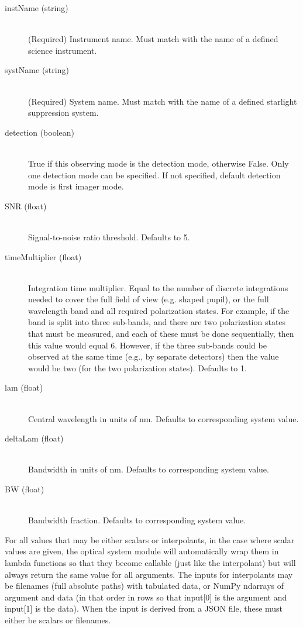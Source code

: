 \documentclass[cleanfoot]{asme2ej}
\begin{document}
\begin{itemize}
\begin{description}
    \begin{description}
        \item[instName (string)]\hfill \\ (Required) Instrument name. Must match with the name of a defined science instrument.
        \item[systName (string)]\hfill \\ (Required) System name. Must match with the name of a defined starlight suppression system.
        \item[detection (boolean)]\hfill \\ True if this observing mode is the detection mode, otherwise False. Only one detection mode can be specified. If not specified, default detection mode is first imager mode.
        \item[SNR (float)]\hfill \\ Signal-to-noise ratio threshold. Defaults to 5.
        \item[timeMultiplier (float)]\hfill \\ Integration time multiplier. Equal to the number of discrete integrations needed to cover the full field of view (e.g. shaped pupil), or the full wavelength band and all required polarization states.  For example, if the band is split into three sub-bands, and there are two polarization states that must be measured, and each of these must be done sequentially, then this value would equal 6.  However, if the three sub-bands could be observed at the same time (e.g., by separate detectors) then the value would be two (for the two polarization states). Defaults to 1.
        \item[lam (float)]\hfill \\ Central wavelength in units of nm. Defaults to corresponding system value.
        \item[deltaLam (float)]\hfill \\ Bandwidth in units of nm. Defaults to corresponding system value.
        \item[BW (float)]\hfill \\ Bandwidth fraction. Defaults to corresponding system value.
    \end{description}
\end{description}
\end{itemize}
For all values that may be either scalars or interpolants, in the case where scalar values are given, the optical system module will automatically wrap them in lambda functions so that they become callable (just like the interpolant) but will always return the same value for all arguments.  The inputs for interpolants may be filenames (full absolute paths) with tabulated data, or NumPy ndarrays of argument and data (in that order in rows so that input[0] is the argument and input[1] is the data).  When the input is derived from a JSON file, these must either be scalars or filenames.
\end{document}
